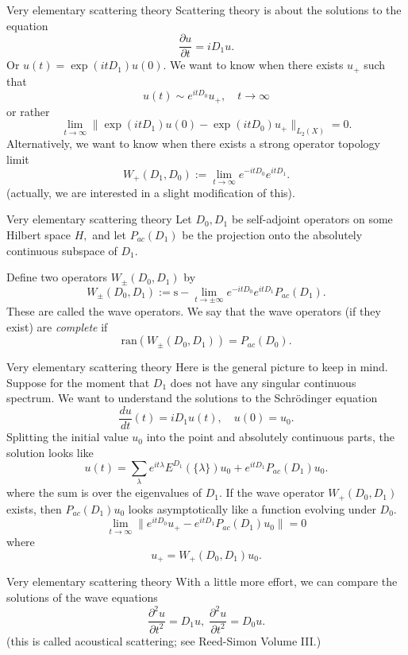 \documentclass{beamer}
\numberwithin{equation}{section}
\theoremstyle{plain}
\theoremstyle{plain}
\theoremstyle{definition}
\theoremstyle{plain}
\theoremstyle{plain}
\theoremstyle{definition}
\begin{document}
\begin{frame}{Very elementary scattering theory}
  Scattering theory is about the solutions to the equation
  \[
    \frac{\partial u}{\partial t} = iD_1u.
  \]
  Or $u(t) = \exp(itD_1)u(0).$ We want to know when
  there exists $u_+$ such that
  \[
  u(t) \sim e^{itD_0}u_+,\quad t\to\infty
  \]
  or rather
  \[
      \lim_{t\to\infty} \|\exp(itD_1)u(0)-\exp(itD_0)u_+\|_{L_2(X)} = 0.
  \]
  Alternatively, we want to know when there exists a strong operator topology limit
  \[
    W_+(D_1,D_0) := \lim_{t\to\infty} e^{-itD_0}e^{itD_1}.
  \]
  (actually, we are interested in a slight modification of this).
\end{frame}


\begin{frame}{Very elementary scattering theory}
  Let $D_0,D_1$ be self-adjoint operators on some Hilbert space $H,$ and let $P_{ac}(D_1)$ be the projection onto the absolutely continuous subspace of $D_1.$

  Define two operators $W_{\pm}(D_0,D_1)$ by
  \[
    W_{\pm}(D_0,D_1) := {\mathrm{s}-}\lim_{t\to\pm \infty} e^{-itD_0}e^{itD_1}P_{ac}(D_1).
  \]
  These are called the wave operators. We say that the wave operators (if they exist) are \emph{complete}
  if
  \[
      \mathrm{ran}(W_{\pm}(D_0,D_1)) = P_{ac}(D_0).
  \]
\end{frame}

\begin{frame}{Very elementary scattering theory}
  Here is the general picture to keep in mind. Suppose for the moment that $D_1$ does not have any singular continuous spectrum. We want to understand the solutions to the Schr\"odinger equation
  \[
    \frac{du}{dt}(t) = iD_1u(t),\quad u(0) = u_0.
  \]
  Splitting the initial value $u_0$ into the point and absolutely continuous parts, the solution looks like
  \[
    u(t) = \sum_{\lambda} e^{it\lambda}E^{D_1}(\{\lambda\})u_0 + e^{itD_1}P_{ac}(D_1)u_0.
  \]
  where the sum is over the eigenvalues of $D_1.$
  If the wave operator $W_{+}(D_0,D_1)$ exists, then $P_{ac}(D_1)u_0$ looks asymptotically like a function evolving under $D_0.$
  \[
      \lim_{t\to\infty} \|e^{itD_0}u_+ - e^{itD_1}P_{ac}(D_1)u_0\| = 0
  \]
  where
  \[
      u_+ =W_+(D_0,D_1)u_0.
  \]
\end{frame}


\begin{frame}{Very elementary scattering theory}
  With a little more effort, we can compare the solutions of the wave equations
  \[
    \frac{\partial^2 u}{\partial t^2} = D_1u,\; \frac{\partial^2 u}{\partial t^2} = D_0u.
  \]
  (this is called acoustical scattering; see Reed-Simon Volume III.)
\end{frame}
\end{document}
